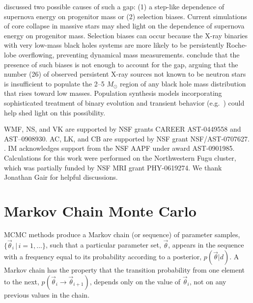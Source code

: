 \documentclass[preprint]{aastex}
\newcommand{\Msun}{M_\odot}
\newcommand{\vtheta}{\vec{\theta}}
\begin{document}
\citet{Fryer1999} discussed two possible causes of such a gap: (1) a
step-like dependence of supernova energy on progenitor mass or (2)
selection biases.  Current simulations of core collapse in massive
stars may shed light on the dependence of supernova energy on
progenitor mass.  Selection biases can occur because the X-ray
binaries with very low-mass black holes systems are more likely to be
persistently Roche-lobe overflowing, preventing dynamical mass
measurements.  \citet{Ozel2010} conclude that the presence of such
biases is not enough to account for the gap, arguing that the number
(26) of observed persistent X-ray sources not known to be neutron
stars is insufficient to populate the 2--5 $\Msun$ region of any black
hole mass distribution that rises toward low masses.  Population
synthesis models incorporating sophisticated treatment of binary
evolution and transient behavior (e.g.\ \citet{Fragos2008,Fragos2009})
could help shed light on this possibility.

\acknowledgements

WMF, NS, and VK are supported by NSF grants CAREER AST-0449558 and
AST–0908930.  AC, LK, and CB are supported by NSF grant
NSF/AST-0707627.  .  IM acknowledges support from the NSF AAPF under
award AST-0901985.  Calculations for this work were performed on the
Northwestern Fugu cluster, which was partially funded by NSF MRI grant
PHY-0619274.  We thank Jonathan Gair for helpful discussions.

\appendix

\section{Markov Chain Monte Carlo}
\label{sec:mcmc}

MCMC methods produce a Markov chain (or sequence) of parameter
samples, $\{ \vtheta_i \, | \, i = 1, \ldots \}$, such that a particular
parameter set, $\vtheta$, appears in the sequence with a frequency
equal to its probability according to a posterior, $p(\vtheta|d)$.  A
Markov chain has the property that the transition probability from one
element to the next, $p(\vtheta_i \to \vtheta_{i+1})$, depends only on
the value of $\vtheta_i$, not on any previous values in the chain.
\end{document}
